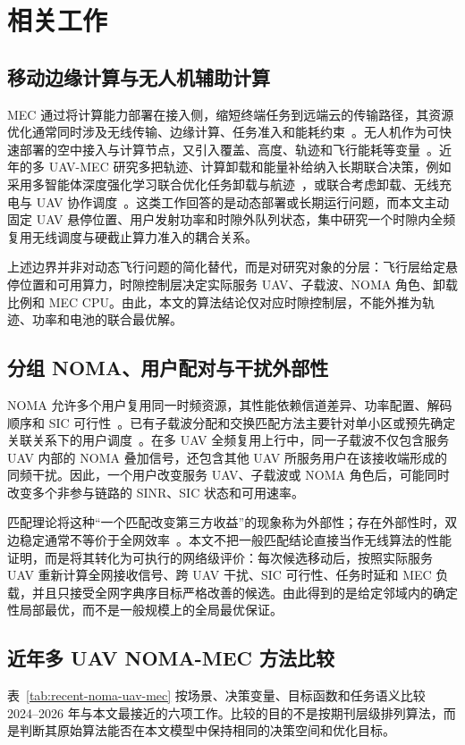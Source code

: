 \chapter{相关工作}

\section{移动边缘计算与无人机辅助计算}
MEC 通过将计算能力部署在接入侧，缩短终端任务到远端云的传输路径，其资源优化通常同时涉及无线传输、边缘计算、任务准入和能耗约束~\cite{mao2017survey}。无人机作为可快速部署的空中接入与计算节点，又引入覆盖、高度、轨迹和飞行能耗等变量~\cite{zeng2016uav,wu2018joint}。近年的多 UAV-MEC 研究多把轨迹、计算卸载和能量补给纳入长期联合决策，例如采用多智能体深度强化学习联合优化任务卸载与航迹~\cite{ju2024multi}，或联合考虑卸载、无线充电与 UAV 协作调度~\cite{zhao2024collaborative}。这类工作回答的是动态部署或长期运行问题，而本文主动固定 UAV 悬停位置、用户发射功率和时隙外队列状态，集中研究一个时隙内全频复用无线调度与硬截止算力准入的耦合关系。

上述边界并非对动态飞行问题的简化替代，而是对研究对象的分层：飞行层给定悬停位置和可用算力，时隙控制层决定实际服务 UAV、子载波、NOMA 角色、卸载比例和 MEC CPU。由此，本文的算法结论仅对应时隙控制层，不能外推为轨迹、功率和电池的联合最优解。

\section{分组 NOMA、用户配对与干扰外部性}
NOMA 允许多个用户复用同一时频资源，其性能依赖信道差异、功率配置、解码顺序和 SIC 可行性~\cite{ding2017survey,ali2016dynamic}。已有子载波分配和交换匹配方法主要针对单小区或预先确定关联关系下的用户调度~\cite{di2017sub,bayat2016matching}。在多 UAV 全频复用上行中，同一子载波不仅包含服务 UAV 内部的 NOMA 叠加信号，还包含其他 UAV 所服务用户在该接收端形成的同频干扰。因此，一个用户改变服务 UAV、子载波或 NOMA 角色后，可能同时改变多个非参与链路的 SINR、SIC 状态和可用速率。

匹配理论将这种“一个匹配改变第三方收益”的现象称为外部性；存在外部性时，双边稳定通常不等价于全网效率~\cite{sasaki1996two,pycia2012stability}。本文不把一般匹配结论直接当作无线算法的性能证明，而是将其转化为可执行的网络级评价：每次候选移动后，按照实际服务 UAV 重新计算全网接收信号、跨 UAV 干扰、SIC 可行性、任务时延和 MEC 负载，并且只接受全网字典序目标严格改善的候选。由此得到的是给定邻域内的确定性局部最优，而不是一般规模上的全局最优保证。

\section{近年多 UAV NOMA-MEC 方法比较}
表~\ref{tab:recent-noma-uav-mec} 按场景、决策变量、目标函数和任务语义比较 2024--2026 年与本文最接近的六项工作。比较的目的不是按期刊层级排列算法，而是判断其原始算法能否在本文模型中保持相同的决策空间和优化目标。

